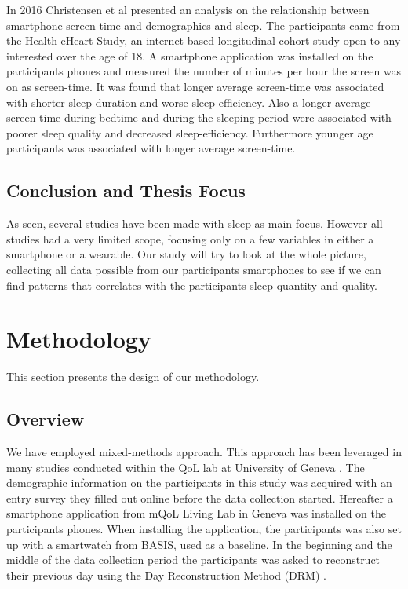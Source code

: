 \documentclass[12pt]{article} %
\begin{document}
In 2016 Christensen et al \cite{demographPhones} presented an analysis on the relationship between smartphone screen-time and demographics and sleep. The participants came from the Health eHeart Study, an internet-based longitudinal cohort study open to any interested over the age of 18. A smartphone application was installed on the participants phones and measured the number of minutes per hour the screen was on as screen-time. It was found that longer average screen-time was associated with shorter sleep duration and worse sleep-efficiency. Also a longer average screen-time during bedtime and during the sleeping period were associated with poorer sleep quality and decreased sleep-efficiency. Furthermore younger age participants was associated with longer average screen-time. 

\newpage
\subsection{Conclusion and Thesis Focus}
As seen, several studies have been made with sleep as main focus. However all studies had a very limited scope, focusing only on a few variables in either a smartphone or a wearable. Our study will try to look at the whole picture, collecting all data possible from our participants smartphones to see if we can find patterns that correlates with the participants sleep quantity and quality.   

\newpage
\section{Methodology}
This section presents the design of our methodology.

\subsection{Overview}
We have employed mixed-methods approach. This approach has been leveraged in many studies conducted within the QoL lab at University of Geneva \cite{seoul}. The demographic information on the participants in this study was acquired with an entry survey they filled out online before the data collection started. Hereafter a smartphone application from mQoL Living Lab in Geneva \cite{mQOL} was installed on the participants phones. When installing the application, the participants was also set up with a smartwatch from BASIS, used as a baseline. In the beginning and the middle of the data collection period the participants was asked to reconstruct their previous day using the Day Reconstruction Method (DRM) \cite{drm}. 
\end{document}
